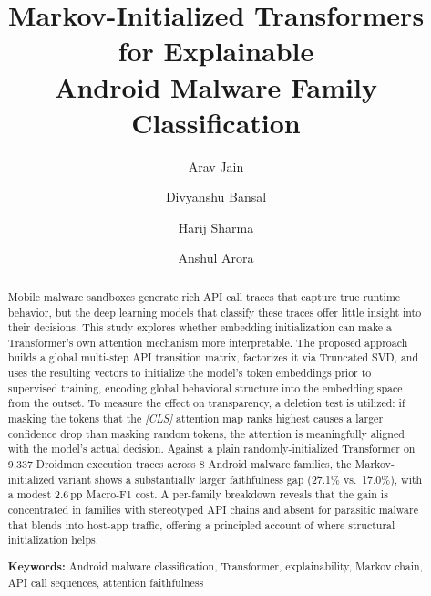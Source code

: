 \documentclass[12pt]{article}
\begin{document}
\title{Markov-Initialized Transformers for Explainable\\
Android Malware Family Classification}

\author[1]{Arav Jain}
\author[1]{Divyanshu Bansal}
\author[1]{Harij Sharma}
\author[1]{Anshul Arora}

\date{}

\maketitle

\begin{abstract}
Mobile malware sandboxes generate rich API call traces that capture true
runtime behavior, but the deep learning models that classify these traces
offer little insight into their decisions.
This study explores whether embedding initialization can make a Transformer's own
attention mechanism more interpretable.
The proposed approach builds a global multi-step API transition matrix,
factorizes it via Truncated SVD, and uses the resulting vectors to
initialize the model's token embeddings prior to supervised training,
encoding global behavioral structure into the embedding space from the
outset.
To measure the effect on transparency, a deletion test is utilized: if masking
the tokens that the \textit{[CLS]} attention map ranks highest causes a
larger confidence drop than masking random tokens, the attention is
meaningfully aligned with the model's actual decision.
Against a plain randomly-initialized Transformer on 9,337 Droidmon
execution traces across 8 Android malware families, the Markov-initialized
variant shows a substantially larger faithfulness gap (27.1\% vs.\ 17.0\%),
with a modest 2.6\,pp Macro-F1 cost.
A per-family breakdown reveals that the gain is concentrated in families
with stereotyped API chains and absent for parasitic malware that blends
into host-app traffic, offering a principled account of where structural
initialization helps.

\textbf{Keywords:} Android malware classification, Transformer, explainability,
Markov chain, API call sequences, attention faithfulness
\end{abstract}

\end{document}
